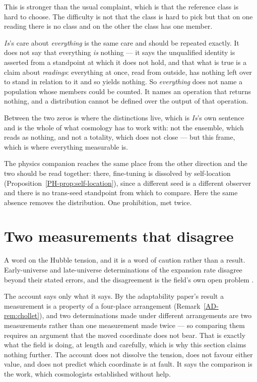 \documentclass[11pt,a4paper]{article}
\theoremstyle{remark}\newtheorem{remark}[definition]{Remark}
\begin{document}
This is stronger than the usual complaint, which is that the reference class is hard to choose.
The difficulty is not that the class is hard to pick but that on one reading there is no class and on
the other the class has one member.

\emph{Is}'s care about \emph{everything} is the same care and should be repeated exactly.
It does not say that everything \emph{is} nothing --- it says the unqualified identity is asserted from a
standpoint at which it does not hold, and that what is true is a claim about \emph{readings}: everything
at once, read from outside, has nothing left over to stand in relation to it and so yields nothing.
So \emph{everything} does not name a population whose members could be counted. It names an
operation that returns nothing, and a distribution cannot be defined over the output of that operation.

Between the two zeros is where the distinctions live, which is \emph{Is}'s own sentence and
is the whole of what cosmology has to work with: not the ensemble, which reads as nothing, and not a
totality, which does not close --- but this frame, which is where everything measurable is.

The physics companion reaches the same place from the other direction and the two should be read
together: there, fine-tuning is dissolved by self-location
(Proposition~\ref{PH-prop:self-location}), since a different seed is a different
observer and there is no trans-seed standpoint from which to compare. Here the same absence removes the
distribution. One prohibition, met twice.

\section{Two measurements that disagree}\label{sec:tension}
A word on the Hubble tension, and it is a word of caution rather than a result. Early-universe and
late-universe determinations of the expansion rate disagree beyond their stated errors, and the
disagreement is the field's own open problem \citep{divalentino2021}.

The account says only what it says. By the adaptability paper's result a measurement is a
property of a four-place arrangement (Remark~\ref{AD-rem:chollet}), and two determinations made under
different arrangements are two
measurements rather than one measurement made twice --- so comparing them requires an argument that the
moved coordinate does not bear. That is exactly what the field is doing, at length and carefully,
which is why this section claims nothing further. The account does not dissolve the tension, does
not favour either value, and does not predict which coordinate is at fault. It says the comparison is
the work, which cosmologists established without help.
\end{document}
